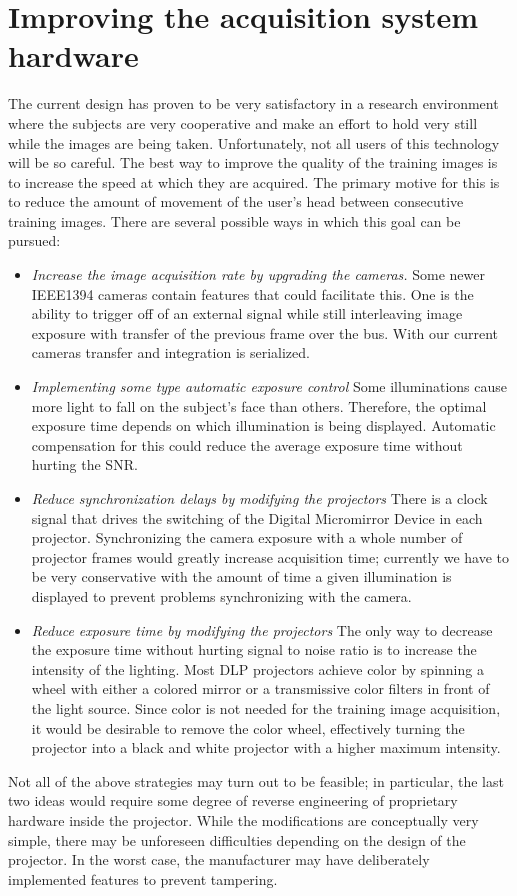 \section{Improving the acquisition system hardware}
The current design has proven to be very satisfactory in a research environment where the subjects are very cooperative and make an effort to hold very still while the images are being taken.  Unfortunately, not all users of this technology will be so careful.  The best way to improve the quality of the training images is to increase the speed at which they are acquired.  The primary motive for this is to reduce the amount of movement of the user's head between consecutive training images.  There are several possible ways in which this goal can be pursued:
\begin{itemize}
\item {\em Increase the image acquisition rate by upgrading the cameras.}  Some newer IEEE1394 cameras contain features that could facilitate this.  One is the ability to trigger off of an external signal while still interleaving image exposure with transfer of the previous frame over the bus.  With our current cameras transfer and integration is serialized.  
\item {\em Implementing some type automatic exposure control}  Some illuminations cause more light to fall on the subject's face than others.  Therefore, the optimal exposure time depends on which illumination is being displayed.  Automatic compensation for this could reduce the average exposure time without hurting the SNR.
\item {\em Reduce synchronization delays by modifying the projectors}  There is a clock signal that drives the switching of the Digital Micromirror Device in each projector.  Synchronizing the camera exposure with a whole number of projector frames would greatly increase acquisition time; currently we have to be very conservative with the amount of time a given illumination is displayed to prevent problems synchronizing with the camera.
\item {\em Reduce exposure time by modifying the projectors}  The only way to decrease the exposure time without hurting signal to noise ratio is to increase the intensity of the lighting.  Most DLP projectors achieve color by spinning a wheel with either a colored mirror or a transmissive color filters in front of the light source.  Since color is not needed for  the training image acquisition, it would be desirable to remove the color wheel, effectively turning the projector into a black and white projector with a higher maximum intensity.
\end{itemize}
Not all of the above strategies may turn out to be feasible; in particular, the last two ideas would require some degree of reverse engineering of proprietary hardware inside the projector.  While the modifications are conceptually very simple, there may be unforeseen difficulties depending on the design of the projector.  In the worst case, the manufacturer may have deliberately implemented features to prevent tampering.


